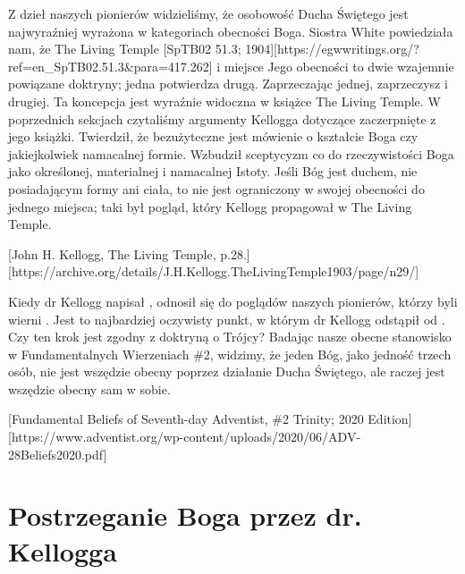 Z dzieł naszych pionierów widzieliśmy, że osobowość Ducha Świętego jest najwyraźniej wyrażona w kategoriach obecności Boga. Siostra White powiedziała nam, że The Living Temple [SpTB02 51.3; 1904][https://egwwritings.org/?ref=en\_SpTB02.51.3&para=417.262]  i miejsce Jego obecności to dwie wzajemnie powiązane doktryny; jedna potwierdza drugą. Zaprzeczając jednej, zaprzeczysz i drugiej. Ta koncepcja jest wyraźnie widoczna w książce The Living Temple. W poprzednich sekcjach czytaliśmy argumenty Kellogga dotyczące  zaczerpnięte z jego książki. Twierdził, że bezużyteczne jest mówienie o kształcie Boga czy jakiejkolwiek namacalnej formie. Wzbudził sceptycyzm co do rzeczywistości Boga jako określonej, materialnej i namacalnej Istoty. Jeśli Bóg jest duchem, nie posiadającym formy ani ciała, to nie jest ograniczony w swojej obecności do jednego miejsca; taki był pogląd, który Kellogg propagował w The Living Temple.

[John H. Kellogg, The Living Temple, p.28.][https://archive.org/details/J.H.Kellogg.TheLivingTemple1903/page/n29/]

Kiedy dr Kellogg napisał , odnosił się do poglądów naszych pionierów, którzy byli wierni . Jest to najbardziej oczywisty punkt, w którym dr Kellogg odstąpił od . Czy ten krok jest zgodny z doktryną o Trójcy? Badając nasze obecne stanowisko w Fundamentalnych Wierzeniach \#2, widzimy, że jeden Bóg, jako jedność trzech osób, nie jest wszędzie obecny poprzez działanie Ducha Świętego, ale raczej jest wszędzie obecny sam w sobie.

[Fundamental Beliefs of Seventh-day Adventist, \#2 Trinity; 2020 Edition][https://www.adventist.org/wp-content/uploads/2020/06/ADV-28Beliefs2020.pdf]

\section*{Postrzeganie Boga przez dr. Kellogga}


